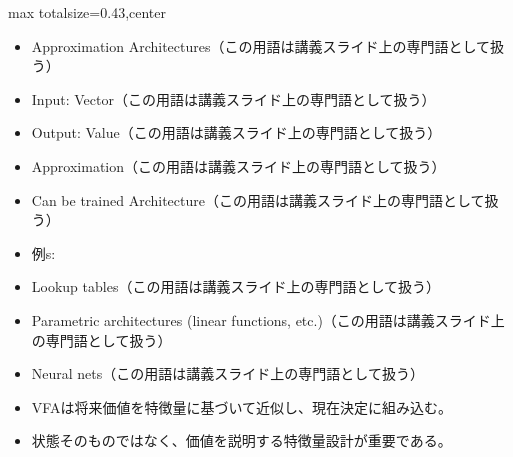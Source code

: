 \clearpage
{}
\begin{minipage}[t]{0.405\textwidth}
\begin{adjustbox}{max totalsize={\textwidth}{0.43\textheight},center}
\begin{minipage}{\textwidth}\scriptsize
{}\begin{itemize}
\item Approximation Architectures（この用語は講義スライド上の専門語として扱う）
\item Input: Vector（この用語は講義スライド上の専門語として扱う）
\item Output: Value（この用語は講義スライド上の専門語として扱う）
\item Approximation（この用語は講義スライド上の専門語として扱う）
\item Can be trained Architecture（この用語は講義スライド上の専門語として扱う）
\item 例s:
\item Lookup tables（この用語は講義スライド上の専門語として扱う）
\item Parametric architectures (linear functions, etc.)（この用語は講義スライド上の専門語として扱う）
\item Neural nets（この用語は講義スライド上の専門語として扱う）
\end{itemize}\begin{itemize}
\item VFAは将来価値を特徴量に基づいて近似し、現在決定に組み込む。
\item 状態そのものではなく、価値を説明する特徴量設計が重要である。
\end{itemize}
\end{minipage}
\end{adjustbox}
\end{minipage}\hfill
